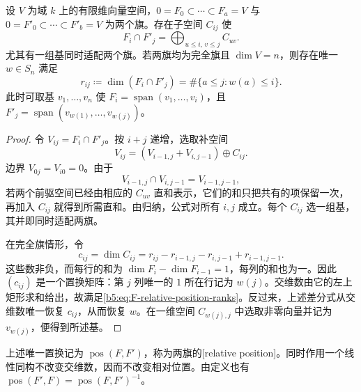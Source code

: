 \begin{lemma}\label{b5:lem:F-common-flag-basis}
	设 \(V\) 为域 \(k\) 上的有限维向量空间，\(0=F_0\subset\cdots\subset F_a=V\) 与 \(0=F'_0\subset\cdots\subset F'_b=V\) 为两个旗。存在子空间 \(C_{ij}\) 使
	\[
		F_i\cap F'_j=\bigoplus_{u\le i,\,v\le j}C_{uv}.
	\]
	尤其有一组基同时适配两个旗。若两旗均为完全旗且 \(\dim V=n\)，则存在唯一 \(w\in S_n\) 满足
	\begin{equation}\label{b5:eq:F-relative-position-ranks}
		r_{ij}\coloneqq\dim(F_i\cap F'_j)=\#\{a\le j:w(a)\le i\}.
	\end{equation}
	此时可取基 \(v_1,\ldots,v_n\) 使 \(F_i=\operatorname{span}(v_1,\ldots,v_i)\)，且 \(F'_j=\operatorname{span}(v_{w(1)},\ldots,v_{w(j)})\)。
\end{lemma}
\begin{proof}
	令 \(V_{ij}=F_i\cap F'_j\)。按 \(i+j\) 递增，选取补空间
	\[
		V_{ij}=(V_{i-1,j}+V_{i,j-1})\oplus C_{ij}.
	\]
	边界 \(V_{0j}=V_{i0}=0\)。由于
	\[
		V_{i-1,j}\cap V_{i,j-1}=V_{i-1,j-1},
	\]
	若两个前驱空间已经由相应的 \(C_{uv}\) 直和表示，它们的和只把共有的项保留一次，再加入 \(C_{ij}\) 就得到所需直和。由归纳，公式对所有 \(i,j\) 成立。每个 \(C_{ij}\) 选一组基，其并即同时适配两旗。

	在完全旗情形，令
	\[
		c_{ij}=\dim C_{ij}
		=r_{ij}-r_{i-1,j}-r_{i,j-1}+r_{i-1,j-1}.
	\]
	这些数非负，而每行的和为 \(\dim F_i-\dim F_{i-1}=1\)，每列的和也为一。因此 \((c_{ij})\) 是一个置换矩阵：第 \(j\) 列唯一的 \(1\) 所在行记为 \(w(j)\)。交维数由它的左上矩形求和给出，故满足\eqref{b5:eq:F-relative-position-ranks}。反过来，上述差分式从交维数唯一恢复 \(c_{ij}\)，从而恢复 \(w\)。在一维空间 \(C_{w(j),j}\) 中选取非零向量并记为 \(v_{w(j)}\)，便得到所述基。
\end{proof}

上述唯一置换记为 \(\operatorname{pos}(F,F')\)，称为两旗的[relative position]。同时作用一个线性同构不改变交维数，因而不改变相对位置。由定义也有 \(\operatorname{pos}(F',F)=\operatorname{pos}(F,F')^{-1}\)。


